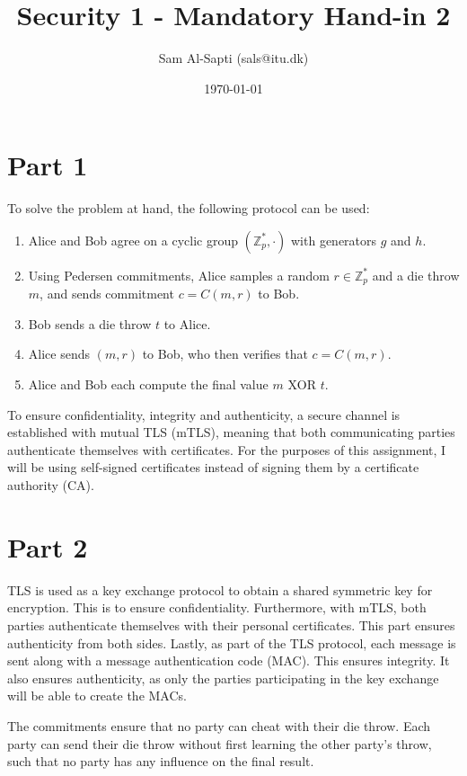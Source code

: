 \documentclass[12pt,a4paper]{article}
\title{Security 1 - Mandatory Hand-in 2}
\date{\today}
\author{Sam Al-Sapti (sals@itu.dk)}
\begin{document}
    \maketitle

    \section*{Part 1}

    To solve the problem at hand, the following protocol can be used:

    \begin{enumerate}
        \item Alice and Bob agree on a cyclic group $(\mathbb{Z}^*_p, \cdot)$
        with generators $g$ and $h$.
        \item Using Pedersen commitments, Alice samples a random $r \in
        \mathbb{Z}^*_p$ and a die throw $m$, and sends commitment $c = C(m, r)$ to
        Bob.
        \item Bob sends a die throw $t$ to Alice.
        \item Alice sends $(m, r)$ to Bob, who then verifies that $c = C(m, r)$.
        \item Alice and Bob each compute the final value $m \text{ XOR } t$.
    \end{enumerate}

    To ensure confidentiality, integrity and authenticity, a secure channel is
    established with mutual TLS (mTLS), meaning that both communicating parties
    authenticate themselves with certificates. For the purposes of this
    assignment, I will be using self-signed certificates instead of signing
    them by a certificate authority (CA).

    \section*{Part 2}

    TLS is used as a key exchange protocol to obtain a shared symmetric key for
    encryption. This is to ensure confidentiality. Furthermore, with mTLS, both
    parties authenticate themselves with their personal certificates. This part
    ensures authenticity from both sides. Lastly, as part of the TLS protocol,
    each message is sent along with a message authentication code (MAC). This
    ensures integrity. It also ensures authenticity, as only the parties
    participating in the key exchange will be able to create the MACs.
    
    The commitments ensure that no party can cheat with their die throw. Each
    party can send their die throw without first learning the other party's
    throw, such that no party has any influence on the final result.
\end{document}
